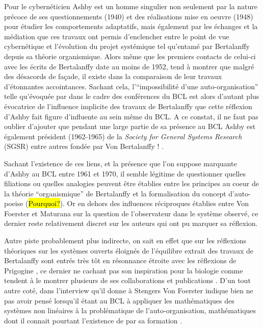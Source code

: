 Pour \autocite[791]{Pouvreau2013} le cybernéticien Ashby est un homme singulier non seulement par la nature précoce de ses questionnements (1940) et des réalisations mise en oeuvre (1948) pour étudier les comportements adaptatifs, mais également par les échanges et la médiation que ces travaux ont permis d'enclencher entre le point de vue cybernétique et l'évolution du projet systémique tel qu'entamé par Bertalanffy depuis sa théorie organismique. Alors même que les premiers contacts de celui-ci avec les écrits de Bertalanffy date au moins de 1952, \textcite[793]{Pouvreau2013} tend à montrer que malgré des désacords de façade, il existe dans la comparaison de leur travaux d'étonnantes accointances. Sachant cela, l'\enquote{impossibilité d'une auto-organisation} telle qu'évoquée par \textcite{Ashby1962}  dans le cadre des conférences du BCL est alors d'autant plus évocatrice de l'influence implicite des travaux de Bertalanffy que cette réflexion d'Ashby fait figure d'influente au sein même du BCL. A ce constat, il ne faut pas oublier d'ajouter que pendant une large partie de sa présence au BCL Ashby est également président (1962-1965) de la \textit{Society for General Systems Research} (SGSR) entre autres fondée par Von Bertalanffy ! \autocite[826]{Pouvreau2013}.

Sachant l'existence de ces liens, et la présence que l'on suppose marquante d'Ashby au BCL entre 1961 et 1970, il semble légitime de questionner quelles filiations ou quelles analogies peuvent être établies entre les principes au coeur de la théorie \enquote{organismique} de Bertalanffy et la formalisation du concept d'auto-poeise (\hl{Pourquoi?}). Or en dehors des influences réciproques établies entre Von Foerster et Maturana sur la question de l'observateur dans le système observé, ce dernier reste relativement discret sur les auteurs qui ont pu marquer sa réflexion.

Autre piste probablement plus indirecte, on sait en effet que sur les réflexions théoriques sur les systèmes ouverts éloignés de l'équilibre extrait des travaux de Bertalanffy sont entrés très tôt en résonnance étroite \autocite[653-661]{Pouvreau2013} avec les réflexions de Prigogine \autocite{Prigogine1996}, ce dernier ne cachant pas son inspiration pour la biologie comme tendent à le montrer plusieurs de ses collaborations et publications \autocites[59-67]{CREA1985}{Prigogine1946}. D'un tout autre coté, dans l'interview qu'il donne à Stengers Von Foerster indique bien ne pas avoir pensé lorsqu'il étant au BCL à appliquer les mathématiques des systèmes non linéaires à la problématique de l'auto-organisation, mathématiques dont il connait pourtant l'existence de par sa formation \autocite[255]{CREA1985}. 

